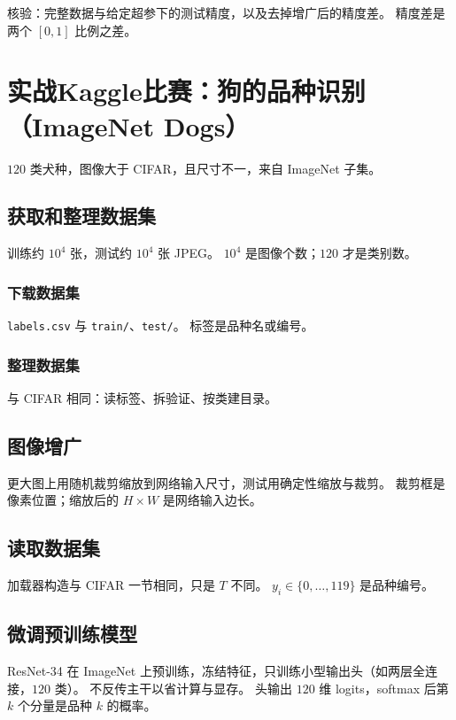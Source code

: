 核验：完整数据与给定超参下的测试精度，以及去掉增广后的精度差。
精度差是两个 $[0,1]$ 比例之差。

\section{实战Kaggle比赛：狗的品种识别（ImageNet Dogs）}

$120$ 类犬种，图像大于 CIFAR，且尺寸不一，来自 ImageNet 子集。

\subsection{获取和整理数据集}

训练约 $10^{4}$ 张，测试约 $10^{4}$ 张 JPEG。
$10^{4}$ 是图像个数；$120$ 才是类别数。

\subsubsection{下载数据集}

\texttt{labels.csv} 与 \texttt{train/}、\texttt{test/}。
标签是品种名或编号。

\subsubsection{整理数据集}

与 CIFAR 相同：读标签、拆验证、按类建目录。

\subsection{图像增广}

更大图上用随机裁剪缩放到网络输入尺寸，测试用确定性缩放与裁剪。
裁剪框是像素位置；缩放后的 $H\times W$ 是网络输入边长。

\subsection{读取数据集}

加载器构造与 CIFAR 一节相同，只是 $T$ 不同。
$y_i\in\{0,\ldots,119\}$ 是品种编号。

\subsection{微调预训练模型}

ResNet-34 在 ImageNet 上预训练，冻结特征，只训练小型输出头（如两层全连接，$120$ 类）。
不反传主干以省计算与显存。
头输出 $120$ 维 logits，softmax 后第 $k$ 个分量是品种 $k$ 的概率。

